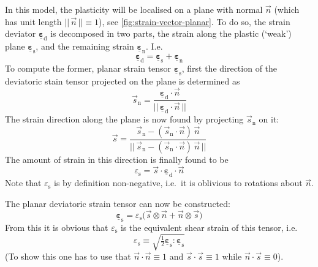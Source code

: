 \documentclass[fleqn, colorlinks]{goose-article}
\newcommand\T[1]{\underline{\bm{{#1}}}}
\begin{document}
In this model, the plasticity will be localised on a plane with normal $\vec{n}$
(which has unit length $||\, \vec{n} \,|| \equiv 1$), see \cref{fig:strain-vector-planar}.
To do so, the strain deviator $\T{\varepsilon}_\mathrm{d}$ is decomposed in two parts,
the strain along the plastic (`weak') plane $\T{\varepsilon}_\mathrm{s}$,
and the remaining strain $\T{\varepsilon}_\mathrm{n}$.
I.e.
\begin{equation}
    \label{eq:planar:strain:decomposition}
    \T{\varepsilon}_\mathrm{d} = \T{\varepsilon}_\mathrm{s} + \T{\varepsilon}_\mathrm{n}
\end{equation}
To compute the former, planar strain tensor $\T{\varepsilon}_\mathrm{s}$,
first the direction of the deviatoric stain tensor projected on the plane is determined as
\begin{equation}
    \vec{s}_\mathrm{n} =
    \frac{
        \T{\varepsilon}_\mathrm{d} \cdot \vec{n}
    }
    {
        ||\, \T{\varepsilon}_\mathrm{d} \cdot \vec{n} \,||
    }
\end{equation}
The strain direction along the plane is now found by projecting $\vec{s}_\mathrm{n}$ on it:
\begin{equation}
    \vec{s} =
    \frac{
        \vec{s}_\mathrm{n} - ( \vec{s}_\mathrm{n} \cdot \vec{n} )\, \vec{n}
    }
    {
        ||\, \vec{s}_\mathrm{n} - ( \vec{s}_\mathrm{n} \cdot \vec{n} )\, \vec{n} \,||
    }
\end{equation}
The amount of strain in this direction is finally found to be
\begin{equation}
    \varepsilon_\mathrm{s} = \vec{s} \cdot \T{\varepsilon}_\mathrm{d} \cdot \vec{n}
\end{equation}
Note that $\varepsilon_\mathrm{s}$ is by definition non-negative,
i.e.\ it is oblivious to rotations about $\vec{n}$.

The planar deviatoric strain tensor can now be constructed:
\begin{equation}
    \T{\varepsilon}_\mathrm{s} = \varepsilon_\mathrm{s}
    \big(
        \vec{s} \otimes \vec{n} + \vec{n} \otimes \vec{s}
    \big)
\end{equation}
From this it is obvious that $\varepsilon_\mathrm{s}$ is
the equivalent shear strain of this tensor, i.e.
\begin{equation}
    \varepsilon_\mathrm{s}
    \equiv
    \sqrt{ \tfrac{1}{2} \T{\varepsilon}_\mathrm{s} : \T{\varepsilon}_\mathrm{s} }
\end{equation}
(To show this one has to use that $\vec{n} \cdot \vec{n} \equiv 1$ and
$\vec{s} \cdot \vec{s} \equiv 1$ while $\vec{n} \cdot \vec{s} \equiv 0$).
\end{document}
